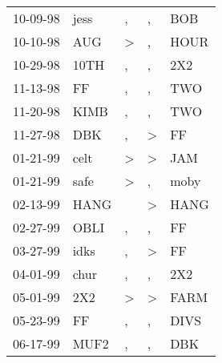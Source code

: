 \begin{supertabular}{p{0.07\textwidth}p{0.06\textwidth}p{0.02\textwidth}p{0.02\textwidth}p{0.06\textwidth}}
 10-09-98\textsuperscript{} &  jess\textsuperscript{} &             , &             , &            BOB\textsuperscript{} \\
 10-10-98\textsuperscript{} &   AUG\textsuperscript{} &  \textgreater &             , &           HOUR\textsuperscript{} \\
 10-29-98\textsuperscript{} &  10TH\textsuperscript{} &             , &             , &            2X2\textsuperscript{} \\
 11-13-98\textsuperscript{} &    FF\textsuperscript{} &             , &             , &            TWO\textsuperscript{} \\
 11-20-98\textsuperscript{} &  KIMB\textsuperscript{} &             , &             , &            TWO\textsuperscript{} \\
 11-27-98\textsuperscript{} &   DBK\textsuperscript{} &             , &  \textgreater &             FF\textsuperscript{} \\
 01-21-99\textsuperscript{} &  celt\textsuperscript{} &  \textgreater &  \textgreater &            JAM\textsuperscript{} \\
 01-21-99\textsuperscript{} &  safe\textsuperscript{} &  \textgreater &             , &           moby\textsuperscript{} \\
 02-13-99\textsuperscript{} &  HANG\textsuperscript{} &               &  \textgreater &           HANG\textsuperscript{} \\
 02-27-99\textsuperscript{} &  OBLI\textsuperscript{} &             , &             , &             FF\textsuperscript{} \\
 03-27-99\textsuperscript{} &  idks\textsuperscript{} &             , &  \textgreater &             FF\textsuperscript{} \\
 04-01-99\textsuperscript{} &  chur\textsuperscript{} &             , &             , &            2X2\textsuperscript{} \\
 05-01-99\textsuperscript{} &   2X2\textsuperscript{} &  \textgreater &  \textgreater &           FARM\textsuperscript{} \\
 05-23-99\textsuperscript{} &    FF\textsuperscript{} &             , &             , &           DIVS\textsuperscript{} \\
 06-17-99\textsuperscript{} &  MUF2\textsuperscript{} &             , &             , &            DBK\textsuperscript{} \\

\end{supertabular}

